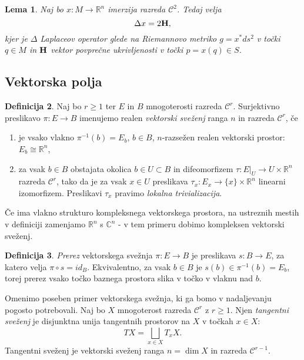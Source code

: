 \documentclass[12pt,a4paper,twoside]{article}
\theoremstyle{definition} %
\newtheorem{definicija}{Definicija}[section]
\theoremstyle{plain} %
\newtheorem{lema}[definicija]{Lema}
\numberwithin{equation}{section}  %
\newcommand{\R}{\mathbb R}
\newcommand{\C}{\mathbb C}
\begin{document}
\begin{lema}
Naj bo $x \colon M \to \R^{n}$ imerzija razreda $\mathcal{C}^2$. Tedaj velja
\begin{equation}
\Delta{x} = 2 \textbf{\textup{H}},
\end{equation}
kjer je $\Delta$ Laplaceov operator glede na Riemannovo metriko $g = x^{*}ds^2$ v točki $q \in M$ in $\textbf{\textup{H}}$ vektor povprečne ukrivljenosti v točki $p = x(q) \in S$.
\end{lema}

\subsection{Vektorska polja}
%
\begin{definicija}
Naj bo $r \geq 1$ ter $E$ in $B$ mnogoterosti razreda $\mathcal{C}^{r}$.
Surjektivno preslikavo $\pi \colon E \to B$ imenujemo realen \emph{vektorski sveženj} ranga $n$ in razreda $\mathcal{C}^{r}$, če
\begin{enumerate}
\item je vsako vlakno $\pi^{-1}(b) = E_{b}$, $b \in B$, $n$-razsežen realen vektorski prostor: $E_{b} \cong \R^{n}$,
\item za vsak $b \in B$ obstajata okolica $b \in U \subset B$ in difeomorfizem $\tau \colon E|_{U} \to U \times \R^{n}$ razreda $\mathcal{C}^{r}$, tako da je za vsak $x \in U$ preslikava $ \tau_{x} \colon E_{x} \to \{x\} \times \R^{n} $ linearni izomorfizem. Preslikavi $\tau_{x}$ pravimo \emph{lokalna trivializacija}.
\end{enumerate}
Če ima vlakno strukturo kompleksnega vektorskega prostora, na ustreznih mestih v definiciji zamenjamo $\R^{n}$ s $\C^{n}$ - v tem primeru dobimo kompleksen vektorski sveženj.
\end{definicija}

\begin{definicija}
\emph{Prerez} vektorskega svežnja $\pi \colon E \to B$ je preslikava $s \colon B \to E$, za katero velja $\pi \circ s = id_{B}$.
Ekvivalentno, za vsak $b \in B$ je $s(b) \in \pi^{-1}(b) = E_{b}$, torej prerez vsako točko baznega prostora slika v točko v vlaknu nad $b$.
\end{definicija}

Omenimo poseben primer vektorskega svežnja, ki ga bomo v nadaljevanju pogosto potrebovali. Naj bo $X$ mnogoterost razreda $\mathcal{C}^{r}$ z $r \geq 1$. Njen \emph{tangentni sveženj} je disjunktna unija tangentnih prostorov na $X$ v točkah $x \in X$:
\[ TX = \bigsqcup_{x \in X} T_{x}X. \]
Tangentni sveženj je vektorski sveženj ranga $n = \dim X$ in razreda $\mathcal{C}^{r-1}$.
\end{document}
